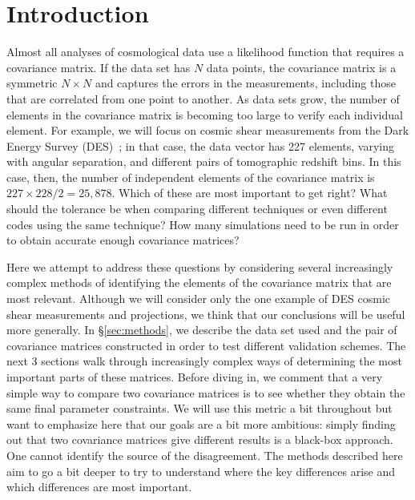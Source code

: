 \documentclass[twocolumn]{\docclass}
\begin{document}
	\dockeys{}
	
	\maketitlepost
	
	
	\section{Introduction}
	\label{sec:intro}
	
	Almost all analyses of cosmological data use a likelihood function that requires a covariance matrix. If the data set has $N$ data points, the covariance matrix is a symmetric $N\times N$ and captures the errors in the measurements, including those that are correlated from one point to another. As data sets grow, the number of elements in the covariance matrix is becoming too large to verify each individual element. For example, we will focus on cosmic shear measurements from the Dark Energy Survey (DES)~\cite{Troxel:2017xyo}; in that case, the data vector has 227 elements, varying with angular separation, and different pairs of tomographic redshift bins. In this case, then, the number of independent elements of the covariance matrix is $227\times 228/2=25,878$. Which of these are most important to get right? What should the tolerance be when comparing different techniques or even different codes using the same technique? How many simulations need to be run in order to obtain accurate enough covariance matrices? 
	
	Here we attempt to address these questions by considering several increasingly complex methods of identifying the elements of the covariance matrix that are most relevant. Although we will consider only the one example of DES cosmic shear measurements and projections, we think that our conclusions will be useful more generally. In \S\ref{sec:methods}, we describe the data set used and the pair of covariance matrices constructed in order to test different validation schemes. The next 3 sections walk through increasingly complex ways of determining the most important parts of these matrices. Before diving in, we comment that a very simple way to compare two covariance matrices is to see whether they obtain the same final parameter constraints. We will use this metric a bit throughout but want to emphasize here that our goals are a bit more ambitious: simply finding out that two covariance matrices give different results is a black-box approach. One cannot identify the source of the disagreement. The methods described here aim to go a bit deeper to try to understand where the key differences arise and which differences are most important.
	
\end{document}
